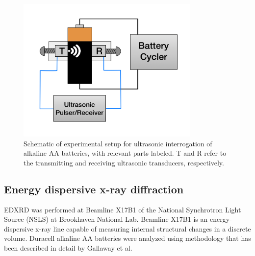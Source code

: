 \begin{figure}[htb]
  \centering
    \includegraphics[width=0.80\textwidth]{ch5-alkbw/images/ExpSchem.png}
    \caption[Schematic of experimental setup for ultrasonic interrogation of alkaline AA batteries.]{Schematic of experimental setup for ultrasonic interrogation of alkaline AA batteries, with relevant parts labeled. T and R refer to the transmitting and receiving ultrasonic transducers, respectively.}
    \label{fig:alkbwschem}
\end{figure}

\subsection{Energy dispersive x-ray diffraction}

EDXRD was performed at Beamline X17B1 of the National Synchrotron Light Source (NSLS) at Brookhaven National Lab. Beamline X17B1 is an energy-dispersive x-ray line capable of measuring internal structural changes in a discrete volume. Duracell alkaline AA batteries were analyzed using methodology that has been described in detail by Gallaway et al.~\cite{gallaway}